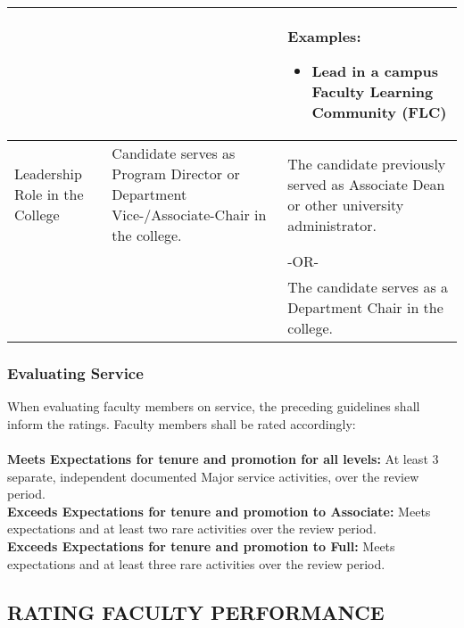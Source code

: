 \documentclass{scrartcl}
\begin{document}
\begin{longtable}{p{3cm}p{5.5cm}P{5.5cm}}
 & &
 Examples:
	\begin{itemize}[noitemsep,leftmargin=*,topsep=0pt,partopsep=0pt]
    \item Lead in a campus
Faculty Learning Community
(FLC)
	\end{itemize}
  \\ 
\hline
Leadership Role in the College & Candidate serves as Program Director or Department
Vice-/Associate-Chair in the college.
& The candidate previously served as Associate Dean or other university administrator. \\
& & -OR- \\
& & The candidate serves as a Department Chair in the college. \\
\hline
\end{longtable}

\subsubsection{Evaluating Service}
When evaluating faculty members on service, the preceding guidelines shall inform the ratings. Faculty members shall be rated accordingly:
\\\\
\textbf{Meets Expectations for tenure and promotion for all levels:} At least 3 separate, independent documented Major service activities, over the review period.
\\
\textbf{Exceeds Expectations for tenure and promotion to Associate:} Meets expectations and at least two rare activities over the review period.
\\
\textbf{Exceeds Expectations for tenure and promotion to Full:} Meets expectations and at least three rare activities over the review period.

\subsection{RATING FACULTY PERFORMANCE}
\end{document}
